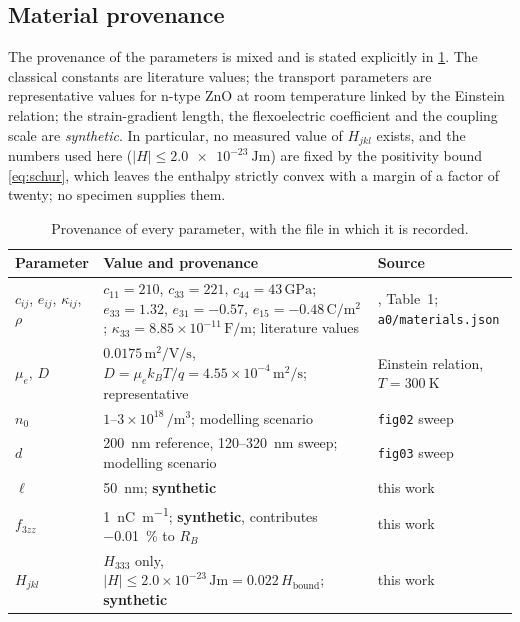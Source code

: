 \subsection{Material provenance}
\label{sec:disc_material}

The provenance of the parameters is mixed and is stated explicitly in
\cref{tab:provenance}.  The classical constants are literature values; the
transport parameters are representative values for n-type ZnO at room
temperature linked by the Einstein relation; the strain-gradient length, the
flexoelectric coefficient and the coupling scale are \emph{synthetic}.  In particular, no measured value of $H_{jkl}$ exists, and the numbers used here
($|H|\le\SI{2.0e-23}{\joule\metre}$) are fixed by the positivity bound
\eqref{eq:schur}, which leaves the enthalpy strictly convex with a margin of a
factor of twenty; no specimen supplies them.

\begin{table}[t]
\centering
\caption{Provenance of every parameter, with the file in which it is recorded.}
\label{tab:provenance}
\small
\begin{tabular}{@{}p{}p{}p{}@{}}
\toprule
Parameter & Value and provenance & Source \\
\midrule
$c_{ij}$, $e_{ij}$, $\kappa_{ij}$, $\rho$ &
$c_{11}=210$, $c_{33}=221$, $c_{44}=43\,\si{\giga\pascal}$;
$e_{33}=1.32$, $e_{31}=-0.57$, $e_{15}=-0.48\,\si{\coulomb\per\square\metre}$;
$\kappa_{33}=8.85\times10^{-11}\,\si{\farad\per\metre}$; literature values &
\cite{zhang2025pscplate}, Table~1;
\texttt{a0/materials.json} \\
$\mu_e$, $D$ & $0.0175\,\si{\square\metre\per\volt\per\second}$,
$D=\mu_e k_BT/q=4.55\times10^{-4}\,\si{\square\metre\per\second}$; representative &
Einstein relation, $T=\SI{300}{\kelvin}$ \\
$n_0$ & $1\text{--}3\times10^{18}\,\si{\per\cubic\metre}$; modelling scenario &
\texttt{fig02} sweep \\
$d$ & \SI{200}{\nano\metre} reference, 120--\SI{320}{\nano\metre} sweep;
modelling scenario & \texttt{fig03} sweep \\
$\ell$ & \SI{50}{\nano\metre}; \textbf{synthetic} & this work \\
$f_{3zz}$ & \SI{1}{\nano\coulomb\per\metre}; \textbf{synthetic}, contributes
\SI{-0.01}{\percent} to $R_B$ & this work \\
$H_{jkl}$ & $H_{333}$ only, $|H|\le2.0\times10^{-23}\,\si{\joule\metre}
=0.022\,H_{\text{bound}}$; \textbf{synthetic} & this work \\
\bottomrule
\end{tabular}
\end{table}

